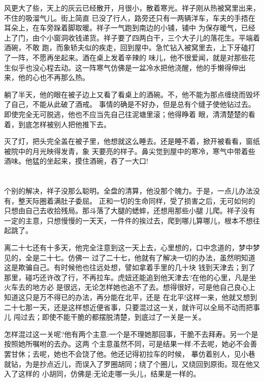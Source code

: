 \documentclass[11pt,a4paper,onecolumn]{article}
\begin{document}
风更大了些，天上的灰云已经散开，月很小，散着寒光。祥子刚从热被窝里出来，不住的吸溜气儿。街上简直
已没了行人，路旁还只有一两辆洋车，车夫的手捂在耳朵上，在车旁跺着脚取暖。祥子一气跑到南边的小铺，铺中
为保存暖气，已经上了门，由个小窗洞收钱递货。祥子要了四两白干，三个大子儿的落花生。平端着酒碗，不敢
跑，而象轿夫似的疾走，回到屋中。急忙钻入被窝里去，上下牙磕打了一阵，不愿再坐起来。酒在桌上发着辛辣的
味儿，他不很爱闻，就是对那些花生似乎也没心程去动。这一阵寒气仿佛是一盆冷水把他浇醒，他的手懒得伸出
来，他的心也不再那么热。

躺了半天，他的眼在被子边上又看了看桌上的酒碗。不，他不能为那点缠绕而毁坏了自己，不能从此破了酒戒。
事情的确是不好办，但是总有个缝子使他钻过去。即使完全无可脱逃，他也不应当先自己往泥塘里滚；他得睁着
眼，清清楚楚的看着，到底怎样被别人把他推下去。

灭了灯，把头完全盖在被子里，他想就这么睡去。还是睡不着，掀开被看看，窗纸被院中的月光映得发青，象
天要亮的样子。鼻尖觉到屋中的寒冷，寒气中带着些酒味。他猛的坐起来，摸住酒碗，吞了一大口!

\pagebreak
\section{}

个别的解决，祥子没那么聪明。全盘的清算，他没那个魄力。于是，一点儿办法没有，整天际圈着满肚子委屈。
正和一切的生命同样，受了损害之后，无可如何的只想由自己去收拾残局。那斗落了大腿的蟋蟀，还想用那些小腿
儿爬。祥子没有一定的主意，只想慢慢的一天天，一件件的挨过去，爬到哪儿算哪儿，根本不想往起跳了。

离二十七还有十多天，他完全注意到这一天上去，心里想的，口中念道的，梦中梦见的，全是二十七。仿佛一
过了二十七，他就有了解决一切的办法，虽然明知道这是欺骗自己。有时候他也往远处想，譬如拿着手里的几十块
钱到天津去；到了那里，碰巧还许改了行，不再拉车。虎妞还能追到他天津去?在他的心里，凡是坐火车去的地方必
是很远，无论怎样她也追不了去。想得很好，可是他自己良心上知道这只是万不得已的办法，再分能在北平，还是
在北平!这样一来，他就又想到二十七那一天，还是这样想近便省事，只要混过这一关，就许可以全局不动而把事儿
闯过去；即使不能干脆的都摆脱清楚，到底过了一关是一关。

怎样混过这一关呢?他有两个主意:一个是不理她那回事，干脆不去拜寿。另一个是按照她所嘱咐的去办。这两
个主意虽然不同，可是结果一样:不去呢，她必不会善罢甘休；去呢，她也不会饶了他。他还记得初拉车的时候，
摹仿着别人，见小巷就钻，为是抄点近儿，而误入了罗圈胡同；绕了个圈儿，又绕回到原街。现在他又入了这样的
小胡同，仿佛是:无论走哪一头儿，结果是一样的。
\end{document}
